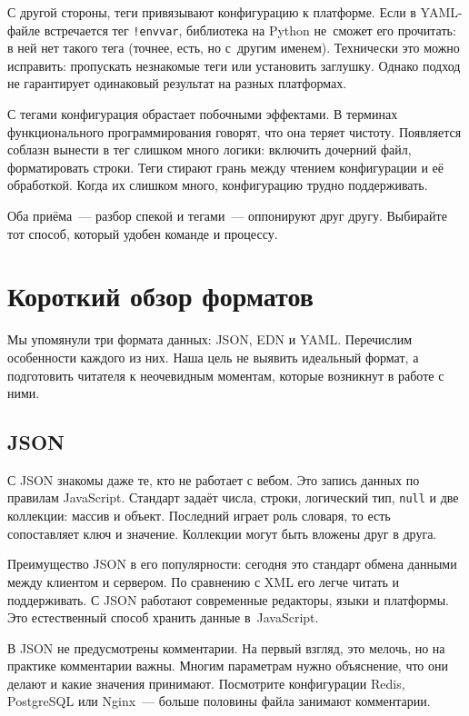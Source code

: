 С другой стороны, теги привязывают конфигурацию к платформе. Если в YAML-файле
встречается тег \verb|!envvar|, библиотека на Python не~сможет его прочитать: в
ней нет такого тега (точнее, есть, но с~другим именем). Технически это можно
исправить: пропускать незнакомые теги или установить заглушку. Однако подход не
гарантирует одинаковый результат на разных платформах.

С тегами конфигурация обрастает побочными эффектами. В терминах функционального
программирования говорят, что она теряет чистоту. Появляется соблазн вынести в
тег слишком много логики: включить дочерний файл, форматировать строки. Теги
стирают грань между чтением конфигурации и её обработкой. Когда их слишком
много, конфигурацию трудно поддерживать.

Оба приёма~--- разбор спекой и тегами~--- оппонируют друг другу. Выбирайте тот
способ, который удобен команде и процессу.

\section{Короткий обзор форматов}

Мы упомянули три формата данных: JSON, EDN и YAML. Перечислим особенности
каждого из них. Наша цель не выявить идеальный формат, а подготовить читателя к
неочевидным моментам, которые возникнут в работе с ними.

\subsection{JSON}


С JSON знакомы даже те, кто не работает с вебом. Это запись данных по правилам
JavaScript. Стандарт задаёт числа, строки, логический тип, \verb|null| и две
коллекции: массив и объект. Последний играет роль словаря, то есть сопоставляет
ключ и значение. Коллекции могут быть вложены друг в друга.


Преимущество JSON в его популярности: сегодня это стандарт обмена данными между
клиентом и сервером. По сравнению с XML его легче читать и поддерживать. С JSON
работают современные редакторы, языки и платформы. Это естественный способ
хранить данные в~JavaScript.

В JSON не предусмотрены комментарии. На первый взгляд, это мелочь, но на
практике комментарии важны. Многим параметрам нужно объяснение, что они делают и
какие значения принимают. Посмотрите конфигурации Redis, PostgreSQL или
Nginx~--- больше половины файла занимают комментарии.

